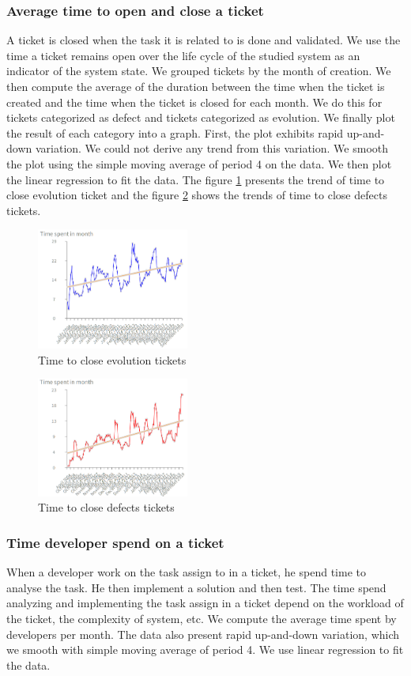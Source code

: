 \documentclass[10pt,conference]{IEEEtran}
\begin{document}
\subsubsection{ Average time to open and close a ticket}
A ticket is closed when the task it is related to is done and validated. 
We use the time a ticket remains open over the life cycle of the studied system as an indicator of the system state. 
We grouped tickets by the month of creation.
We then compute the average of  the duration between the time when the ticket is created and the time when the ticket is closed for each month.  
We do this for tickets categorized as defect and tickets categorized as evolution. 
We finally plot the result of each category into a graph.  First, the plot exhibits rapid up-and-down variation.
We could not derive any trend from this variation. 
We smooth the plot using the simple moving average of period 4 on the data.  
We then plot the linear regression to fit the data.  
The figure \ref{fig:evol} presents the trend of time to close evolution ticket and  the figure \ref{fig:defect} shows  the trends  of time to close defects tickets.
\begin{figure}[H]
  \centering
  \includegraphics[width=50mm]{./images/openCloseEvol.png}
  \caption{Time to close evolution tickets}
  \label{fig:evol}
\end{figure}

\begin{figure}[H]
  \centering
  \includegraphics[width=50mm]{./images/openCloseBug.png}
  \caption{Time to close defects tickets}
  \label{fig:defect}
\end{figure}




\subsubsection{Time developer spend on a ticket }
When a developer work on the task assign to in a ticket, he spend time to analyse  the task. 
He then implement a solution and then test.
 The time spend analyzing and implementing the task assign in a ticket depend on the workload  of the ticket, the complexity of system, etc.  
We compute the average time spent by developers per month. 
The data also present rapid up-and-down variation, which we smooth with simple moving average of period 4. We use  linear regression to fit the data.   
\end{document}
